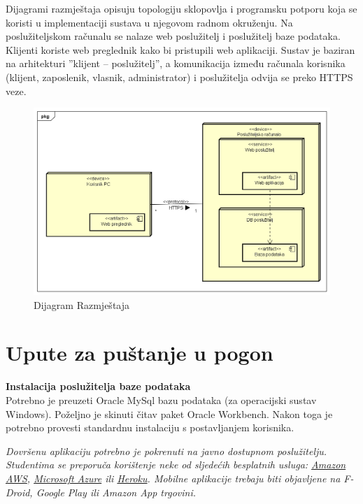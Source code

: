 			Dijagrami razmještaja opisuju topologiju sklopovlja i programsku potporu koja se koristi u implementaciji sustava u njegovom radnom okruženju. Na poslužiteljskom računalu se nalaze web poslužitelj i poslužitelj baze podataka. Klijenti koriste web preglednik kako bi pristupili web aplikaciji. Sustav je baziran na arhitekturi ”klijent – poslužitelj”, a komunikacija između računala korisnika (klijent, zaposlenik, vlasnik, administrator) i poslužitelja odvija se preko HTTPS veze.
			
			
			\begin{figure}[H]
				\includegraphics[width=\textwidth]{slike/DijagramRazmjestaja.png} %
				\caption{Dijagram Razmještaja}
				\label{fig:DijagramRazmještaja} %
			\end{figure}
			
			\eject 
		
		\section{Upute za puštanje u pogon}
		
			\textbf{Instalacija poslužitelja baze podataka}\\
		
			 Potrebno je preuzeti Oracle MySql bazu podataka (za operacijski sustav Windows).
			 Poželjno je skinuti čitav paket Oracle Workbench. Nakon toga je potrebno provesti standardnu instalaciju s postavljanjem korisnika.
			
			
			 \textit{Dovršenu aplikaciju potrebno je pokrenuti na javno dostupnom poslužitelju. Studentima se preporuča korištenje neke od sljedećih besplatnih usluga: \href{https://aws.amazon.com/}{Amazon AWS}, \href{https://azure.microsoft.com/en-us/}{Microsoft Azure} ili \href{https://www.heroku.com/}{Heroku}. Mobilne aplikacije trebaju biti objavljene na F-Droid, Google Play ili Amazon App trgovini.}
			
			
			\eject 